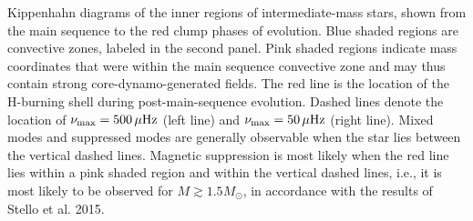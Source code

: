 \label{fig:DipoleHist}
Kippenhahn diagrams of the inner regions of intermediate-mass stars, shown from the main sequence to the red clump phases of evolution. Blue shaded regions are convective zones, labeled in the second panel. Pink shaded regions indicate mass coordinates that were within the main sequence convective zone and may thus contain strong core-dynamo-generated fields. The red line is the location of the H-burning shell during post-main-sequence evolution. Dashed lines denote the location of $\nu_{\rm max} = 500 \, \mu{\rm Hz}$ (left line) and $\nu_{\rm max} = 50 \, \mu{\rm Hz}$ (right line). Mixed modes and suppressed modes are generally observable when the star lies between the vertical dashed lines. Magnetic suppression is most likely when the red line lies within a pink shaded region and within the vertical dashed lines, i.e., it is most likely to be observed for $M \gtrsim 1.5 M_\odot$, in accordance with the results of Stello et al. 2015. 
  